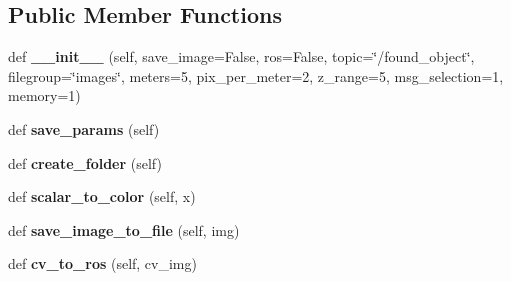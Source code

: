 \subsection*{Public Member Functions}
\begin{DoxyCompactItemize}
\item 
\mbox{\label{classgr__ml_1_1gr__terrain__recognition_1_1coder_1_1Features2Image_a4334a8092dab6d11470e0ebf92c3f6ba}} 
def {\bfseries \+\_\+\+\_\+init\+\_\+\+\_\+} (self, save\+\_\+image=False, ros=False, topic=\char`\"{}/found\+\_\+object\char`\"{}, filegroup=\char`\"{}images\char`\"{}, meters=5, pix\+\_\+per\+\_\+meter=2, z\+\_\+range=5, msg\+\_\+selection=1, memory=1)
\item 
\mbox{\label{classgr__ml_1_1gr__terrain__recognition_1_1coder_1_1Features2Image_a842358d50f7269a48fa291ca67c148f0}} 
def {\bfseries save\+\_\+params} (self)
\item 
\mbox{\label{classgr__ml_1_1gr__terrain__recognition_1_1coder_1_1Features2Image_aed72a417f0417c5b549e94ec512aa91f}} 
def {\bfseries create\+\_\+folder} (self)
\item 
\mbox{\label{classgr__ml_1_1gr__terrain__recognition_1_1coder_1_1Features2Image_a97f9bb1d792e40f0bf99bfef9369cd9a}} 
def {\bfseries scalar\+\_\+to\+\_\+color} (self, x)
\item 
\mbox{\label{classgr__ml_1_1gr__terrain__recognition_1_1coder_1_1Features2Image_abe1a38865fbbd0f401f2f046621d25a8}} 
def {\bfseries save\+\_\+image\+\_\+to\+\_\+file} (self, img)
\item 
\mbox{\label{classgr__ml_1_1gr__terrain__recognition_1_1coder_1_1Features2Image_a425c64f9b30933fa432ca578818df14f}} 
def {\bfseries cv\+\_\+to\+\_\+ros} (self, cv\+\_\+img)
\item 
\mbox{\label{classgr__ml_1_1gr__terrain__recognition_1_1coder_1_1Features2Image_ad652043c091d17ef0764101808058298}} 

\end{DoxyCompactItemize}
